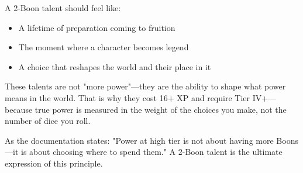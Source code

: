 \documentclass[11pt]{book}
\begin{document}
A 2-Boon talent should feel like:
\begin{itemize}
  \item A lifetime of preparation coming to fruition
  \item The moment where a character becomes legend
  \item A choice that reshapes the world and their place in it
\end{itemize}

These talents are not "more power"---they are the ability to shape what power means in the world. That is why they cost 16+ XP and require Tier IV+---because true power is measured in the weight of the choices you make, not the number of dice you roll.

As the documentation states: "Power at high tier is not about having more Boons---it is about choosing where to spend them." A 2-Boon talent is the ultimate expression of this principle.
\end{document}
